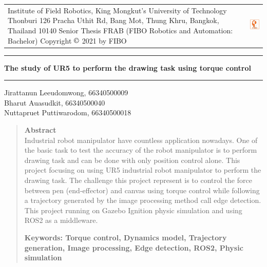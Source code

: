 \documentclass[10pt]{article}
\begin{document}
\noindent
\begin{tabular}{p{} c} 
    \parbox[t]{0.90\textwidth}{ 
        \raggedright 
        Institute of Field Robotics, King Mongkut's University of Technology Thonburi \\
        126 Pracha Uthit Rd, Bang Mot, Thung Khru, Bangkok, Thailand 10140 \\
        Senior Thesis FRAB (FIBO Robotics and Automation: Bachelor) \\
        Copyright $\copyright$ 2021 by FIBO
        \vspace{0.5cm}
    }
    & 
    \raisebox{-1.4cm}
    {
        \includegraphics[width=0.7in, keepaspectratio]{img/fibo_logo.png}
    }
\end{tabular}

\noindent
\rule{\textwidth}{1pt}

\vspace{0.4cm}
\noindent
\Large {\textbf{The study of UR5 to perform the drawing task using torque control}}

\noindent
\rule{\textwidth}{0.3pt}

\begin{minipage}[t]{0.40\textwidth}
    \raggedright
    \normalsize
    Jirattanun Leeudomwong, 66340500009 \\
    Bharut Auasudkit, 66340500040 \\
    Nuttapruet Puttiwarodom, 66340500018 \\
\end{minipage}
\hfill
\vline
\begin{minipage}[t]{0.60\textwidth}
    \raggedright
    \normalsize
    \begin{quote}
        \textbf{Abstract} \\
        Industrial robot manipulator have countless application nowadays. One of the basic task to test the accuracy of the robot manipulator is to perform drawing task and can be done with only position control alone. This project focusing on using UR5 industrial robot manipulator to perform the drawing task. The challenge this project represent is to control the force between pen (end-effector) and canvas using torque control while following a trajectory generated by the image processing method call edge detection. This project running on Gazebo Ignition physic simulation and using ROS2 as a middleware.
        \vspace{0.5cm}

        \textbf{Keywords: Torque control, Dynamics model, Trajectory generation, Image processing, Edge detection, ROS2, Physic simulation}
    \end{quote}
\end{minipage}
\end{document}
